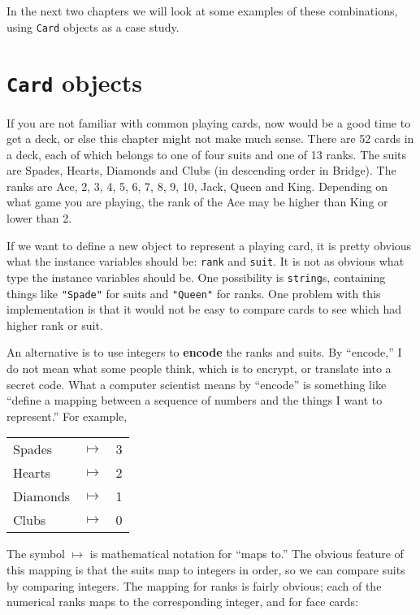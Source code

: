 In the next two chapters we will look at some examples of these
combinations, using {\tt Card} objects as a case study.

\section{{\tt Card} objects}

If you are not familiar with common playing cards, now would be a good
time to get a deck, or else this chapter might not make much sense.
There are 52 cards in a deck, each of which belongs to one of four
suits and one of 13 ranks.  The suits are Spades, Hearts, Diamonds and
Clubs (in descending order in Bridge).  The ranks are Ace, 2, 3, 4, 5,
6, 7, 8, 9, 10, Jack, Queen and King.  Depending on what game you are
playing, the rank of the Ace may be higher than King or lower than 2.


If we want to define a new object to represent a playing card, it is
pretty obvious what the instance variables should be: {\tt rank} and
{\tt suit}.  It is not as obvious what type the instance variables
should be.  One possibility is {\tt string}s, containing things like
{\tt "Spade"} for suits and {\tt "Queen"} for ranks.  One problem with
this implementation is that it would not be easy to compare cards to
see which had higher rank or suit.


An alternative is to use integers to {\bf encode} the ranks and
suits.  By ``encode,'' I do not mean what some people think, which
is to encrypt, or translate into a secret code.  What a computer
scientist means by ``encode'' is something like ``define a mapping
between a sequence of numbers and the things I want to represent.''
For example,

\vspace{0.1in}
\begin{tabular}{l c l}
Spades & $\mapsto$ & 3 \\
Hearts & $\mapsto$ & 2 \\
Diamonds & $\mapsto$ & 1 \\
Clubs & $\mapsto$ & 0
\end{tabular}
\vspace{0.1in}

The symbol $\mapsto$ is mathematical notation for ``maps to.''
The obvious feature of this mapping is that the suits map to
integers in order, so we can compare suits by comparing integers.
The mapping for ranks is fairly obvious; each of the numerical
ranks maps to the corresponding integer, and for face cards:


